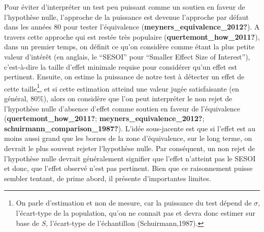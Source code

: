 \documentclass[
  english,
  man]{apa6}
\begin{document}
Pour éviter d'interpréter un test peu puissant comme un soutien en faveur de l'hypothèse nulle, l'approche de la puissance est devenue l'approche par défaut dans les années 80 pour tester l'équivalence (\textbf{meyners\_equivalence\_2012?}). A travers cette approche qui est restée très populaire (\textbf{quertemont\_how\_2011?}), dans un premier temps, on définit ce qu'on considère comme étant la plus petite valeur d'intérêt (en anglais, le ``SESOI'' pour ``Smaller Effect Size of Interest''), c'est-à-dire la taille d'effet minimale requise pour considérer qu'un effet est pertinent. Ensuite, on estime la puissance de notre test à détecter un effet de cette taille\footnote{On parle d'estimation et non de mesure, car la puissance du test dépend de $\sigma$, l'écart-type de la population, qu'on ne connait pas et devra donc estimer sur base de $S$, l'écart-type de l'échantillon (Schuirmann,1987).}, et si cette estimation atteind une valeur jugée satisfaisante (en général, 80\%), alors on considère que l'on peut interpréter le non rejet de l'hypothèse nulle d'absence d'effet comme soutien en faveur de l'équivalence (\textbf{quertemont\_how\_2011?}; \textbf{meyners\_equivalence\_2012?}; \textbf{schuirmann\_comparison\_1987?}). L'idée sous-jacente est que si l'effet est au moins aussi grand que les bornes de la zone d'équivalence, sur le long terme, on devrait le plus souvent rejeter l'hypothèse nulle. Par conséquent, un non rejet de l'hypothèse nulle devrait généralement signifier que l'effet n'atteint pas le SESOI et donc, que l'effet observé n'est pas pertinent. Bien que ce raisonnement puisse sembler tentant, de prime abord, il présente d'importantes limites.
\end{document}
